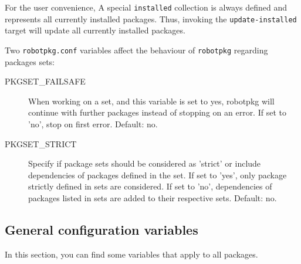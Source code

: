 For  the user  convenience,  A  special {\tt  installed}  collection is  always
defined  and represents all  currently installed  packages. Thus,  invoking the
{\tt update-installed} target will update all currently installed packages.

Two {\tt robotpkg.conf} variables affect the behaviour of {\tt robotpkg}
regarding packages sets:

\begin{description}
   \item[PKGSET\_FAILSAFE] When working on a set, and this variable is set to
   yes, robotpkg will continue with further packages instead of stopping on an
   error. If set to 'no', stop on first error. Default: no.

   \item[PKGSET\_STRICT] Specify if package sets should be considered as
   'strict' or include dependencies of packages defined in the set. If set to
   'yes', only package strictly defined in sets are considered. If set to 'no',
   dependencies of packages listed in sets are added to their respective
   sets. Default: no.
\end{description}

\subsection{General configuration variables} %

In  this  section,  you can   find some  variables   that apply  to  all \robotpkg
packages.


